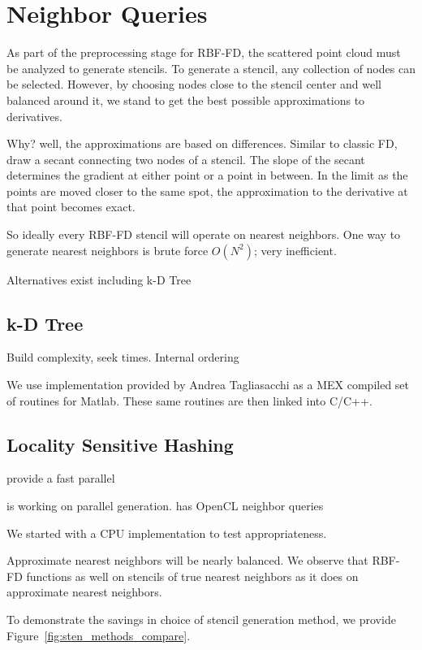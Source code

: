 \documentclass{report}
\begin{document}
\section{Neighbor Queries} 

As part of the preprocessing stage for RBF-FD, the scattered point cloud must
be analyzed to generate stencils. To generate a stencil, any collection of
nodes can be selected. However, by choosing nodes close to the stencil center
and well balanced around it, we stand to get the best possible approximations
to derivatives. 

Why? well, the approximations are based on differences. Similar to classic FD,
draw a secant connecting two nodes of a stencil. The slope of the secant
determines the gradient at either point or a point in between. In the limit as
the points are moved closer to the same spot, the approximation to the
derivative at that point becomes exact. 

So ideally every RBF-FD stencil will operate on nearest neighbors. One way to
generate nearest neighbors is brute force $O(N^{2})$; very inefficient. 

Alternatives exist including k-D Tree

\subsection{k-D Tree}
Build complexity, seek times. Internal ordering 

We use implementation provided by Andrea Tagliasacchi \cite{tagliasacchi} as a MEX compiled set of routines for Matlab. These same routines are then linked into C/C++. 

\subsection{Locality Sensitive Hashing}

\cite{Connor2009} provide a fast parallel 

\cite{Henke2012} is working on parallel generation. \cite{IanJohnsonThesis} has OpenCL neighbor queries

We started with a CPU implementation to test appropriateness. 




Approximate nearest neighbors will be nearly balanced. 
We observe that RBF-FD functions as well on stencils of true nearest neighbors as it does on approximate nearest neighbors.

To demonstrate the savings in choice of stencil generation method, we provide Figure~\ref{fig:sten_methods_compare}. 
 
\end{document}
